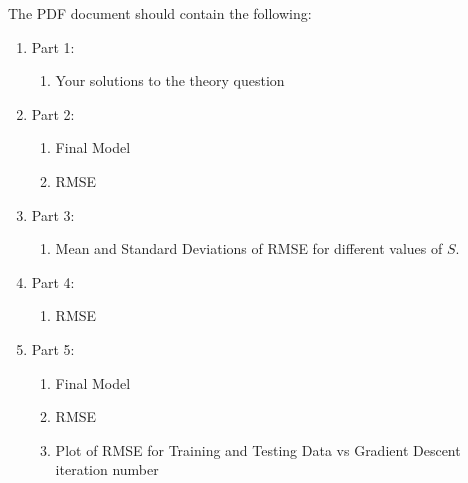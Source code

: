 \documentclass[12pt]{article}
\begin{document}
\noindent
The PDF document should contain the following:

\begin{enumerate}
\item Part 1:
	\begin{enumerate}
	\item Your solutions to the theory question
	\end{enumerate}
\item Part 2:
	\begin{enumerate}
	\item Final Model
	\item RMSE
	\end{enumerate}
\item Part 3:
	\begin{enumerate}
	\item Mean and Standard Deviations of RMSE for different values of $S$.
	\end{enumerate}
\item Part 4:
	\begin{enumerate}
	\item RMSE
	\end{enumerate}	
\item Part 5:
	\begin{enumerate}
	\item Final Model
	\item RMSE
	\item Plot of RMSE for Training and Testing Data vs Gradient Descent iteration number
	\end{enumerate}
\end{enumerate}
\end{document}
